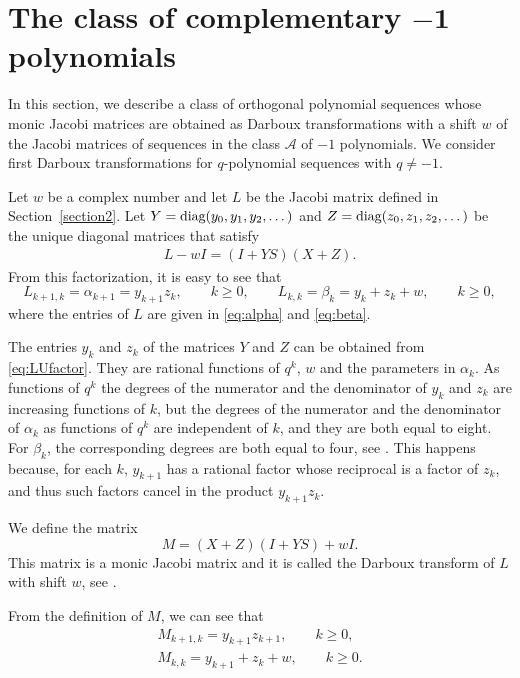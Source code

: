 \documentclass[10pt,a4paper]{amsart}
\def\cA{\mathcal A}
\def\diag{\hbox{diag}}
\numberwithin{equation}{section}
\begin{document}
\section[The class of complementary -1 polynomials]{The class of complementary $\boldsymbol{-1}$ polynomials}\label{section6}

In this section, we describe a class of orthogonal polynomial sequences whose monic Jacobi matrices are obtained as Darboux transformations with a shift $w$ of the Jacobi matrices of sequences in the class $\cA$ of $-1$ polynomials. We consider first Darboux transformations for $q$-polynomial sequences with $q \ne -1$.

Let $w$ be a complex number and let $L$ be the Jacobi matrix defined in Section~\ref{section2}. Let ${Y=\diag(y_0,y_1,y_2,\dots)}$ and $Z=\diag(z_0,z_1,z_2,\dots)$ be the unique diagonal matrices that satisfy
\begin{gather} \label{eq:LUfactor}
L -w I = (I + Y S) ( X+Z).
\end{gather}
From this factorization, it is easy to see that
\begin{equation*}%
	L_{k+1,k}=\alpha_{k+1}= y_{k+1} z_k, \qquad k\ge 0,
\qquad %
	L_{k,k}=\beta_k= y_k+ z_k +w, \qquad k\ge 0,
\end{equation*}
where the entries of $L$ are given in \eqref{eq:alpha} and \eqref{eq:beta}.

The entries $y_k$ and $z_k$ of the matrices $Y$ and $Z$
 can be obtained from \eqref{eq:LUfactor}. They are rational functions of $q^k$, $w$ and the parameters in $\alpha_k$. As functions of $q^k$ the degrees of the numerator and the denominator of $y_k$ and $z_k$ are increasing functions of $k$, but the degrees of the numerator and the denominator of $\alpha_k$ as functions of $q^k$ are independent of $k$, and they are both equal to eight. For $\beta_k$, the corresponding degrees are both equal to four, see \cite[Section~7]{Uni}. This happens because, for each $k$, $y_{k+1}$ has a rational factor whose reciprocal is a factor of $z_k$, and thus such factors cancel in the product $y_{k+1} z_k$.

 We define the matrix
 \begin{equation}\label{eq:Darb}
	 M= (X+Z) (I+ Y S)+ w I.
	\end{equation}
This matrix is a monic Jacobi matrix and it is called the Darboux transform of $L$ with shift $w$, see \cite{BuenoM}.

From the definition of $M$, we can see that
\begin{gather}\label{eq:alMyz}
	M_{k+1,k}= y_{k+1} z_{k+1}, \qquad k \ge 0,\\
\label{eq:beMyz}
	M_{k,k}= y_{k+1} + z_k + w, \qquad k\ge 0.
\end{gather}
\end{document}
